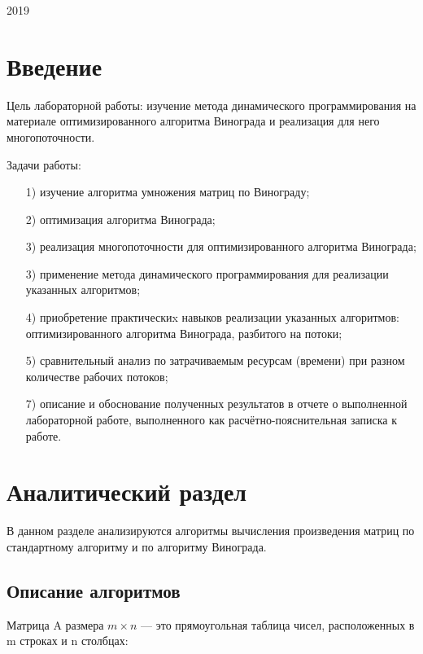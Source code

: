 \documentclass[a4paper,14pt]{article}
\begin{document}
\vspace*{40mm}
\begin{center}
2019    
\end{center}
\thispagestyle{empty}
\pagebreak


\tableofcontents
\pagebreak


\section*{Введение}

Цель лабораторной работы: изучение метода динамического программирования на материале оптимизированного алгоритма Винограда и реализация для него многопоточности.

Задачи работы:
\begin{enumerate} 
	\item[1)] изучение алгоритма умножения матриц по Винограду;
	\item[2)] оптимизация алгоритма Винограда;
	\item[3)] реализация многопоточности для оптимизированного алгоритма Винограда;
	\item[3)] применение метода динамического программирования для реализации указанных алгоритмов;
	\item[4)] приобретение практическиx навыков реализации указанных алгоритмов: оптимизированного алгоритма Винограда, разбитого на потоки;
	\item[5)] сравнительный анализ по затрачиваемым ресурсам (времени) при разном количестве рабочих потоков;
	\item[7)] описание и обоснование полученных результатов в отчете о выполненной лабораторной работе, выполненного как расчётно-пояснительная записка к работе. 
\end{enumerate} 
\pagebreak



\section{Аналитический раздел}
	
	В данном разделе анализируются алгоритмы вычисления произведения матриц по стандартному алгоритму и по алгоритму Винограда. 
	
 
	
	\subsection{Описание алгоритмов}
	Матрица A размера $m \times n$ — это прямоугольная таблица чисел, расположенных в m строках и n столбцах:
	
\end{document}
